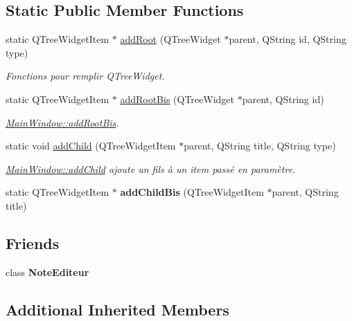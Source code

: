 \subsection*{Static Public Member Functions}
\begin{DoxyCompactItemize}
\item 
static Q\+Tree\+Widget\+Item $\ast$ \hyperlink{classMainWindow_ae153bcf0a046bdd377ffa161368ec90e}{add\+Root} (Q\+Tree\+Widget $\ast$parent, Q\+String id, Q\+String type)
\begin{DoxyCompactList}\small\item\em Fonctions pour remplir Q\+Tree\+Widget. \end{DoxyCompactList}\item 
static Q\+Tree\+Widget\+Item $\ast$ \hyperlink{classMainWindow_aa5864092893ae56234b7c6a6f6de41d4}{add\+Root\+Bis} (Q\+Tree\+Widget $\ast$parent, Q\+String id)
\begin{DoxyCompactList}\small\item\em \hyperlink{classMainWindow_aa5864092893ae56234b7c6a6f6de41d4}{Main\+Window\+::add\+Root\+Bis}. \end{DoxyCompactList}\item 
static void \hyperlink{classMainWindow_a34eb6cdb9e565f9455e54ba5e1f3c434}{add\+Child} (Q\+Tree\+Widget\+Item $\ast$parent, Q\+String title, Q\+String type)
\begin{DoxyCompactList}\small\item\em \hyperlink{classMainWindow_a34eb6cdb9e565f9455e54ba5e1f3c434}{Main\+Window\+::add\+Child} ajoute un fils à un item passé en paramètre. \end{DoxyCompactList}\item 
\mbox{\label{classMainWindow_af87ad0d848a3f96eee6a5e4065e18809}} 
static Q\+Tree\+Widget\+Item $\ast$ {\bfseries add\+Child\+Bis} (Q\+Tree\+Widget\+Item $\ast$parent, Q\+String title)
\end{DoxyCompactItemize}
\subsection*{Friends}
\begin{DoxyCompactItemize}
\item 
\mbox{\label{classMainWindow_abfe6faf8aea4b608cb1b7cbe0db6e9e3}} 
class {\bfseries Note\+Editeur}
\end{DoxyCompactItemize}
\subsection*{Additional Inherited Members}


